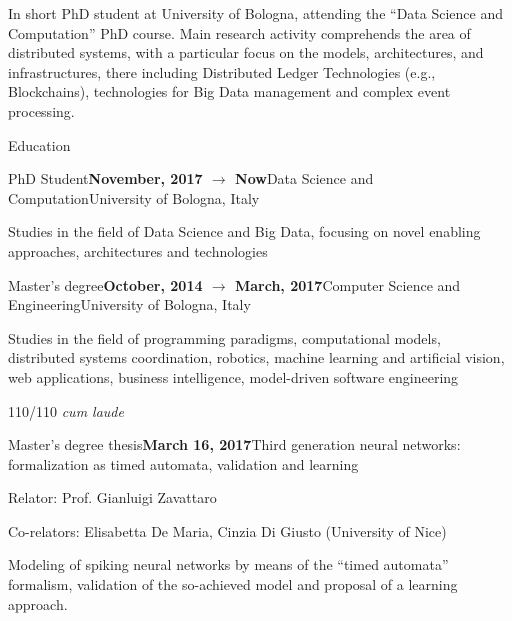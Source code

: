 \documentclass{resume} %
\begin{document}
\begin{rSection}{In short}
PhD student at University of Bologna, attending the ``Data Science and Computation'' PhD course.
%
Main research activity comprehends the area of distributed systems, with a particular focus on the models, architectures, and infrastructures, there including Distributed Ledger Technologies (e.g., Blockchains), technologies for Big Data management and complex event processing.
\end{rSection}


\begin{rSection}{Education}
\begin{rSubsection}{PhD Student}{\textbf{November, 2017 $\rightarrow$ Now}}{Data Science and Computation}{University of Bologna, Italy}
	\item Studies in the field of Data Science and Big Data, focusing on novel enabling approaches, architectures and technologies
\end{rSubsection}
%
\begin{rSubsection}{Master's degree}{\textbf{October, 2014 $\rightarrow$ March, 2017}}{Computer Science and Engineering}{University of Bologna, Italy}
\item Studies in the field of programming paradigms, computational models, distributed systems coordination, robotics, machine learning and artificial vision, web applications, business intelligence, model-driven software engineering

\item 110/110 \emph{cum laude}
\end{rSubsection}
\begin{rSubsection}{Master's degree thesis}{\textbf{March 16, 2017}}{Third generation neural networks: formalization as timed automata, validation and learning}{\begin{flushright}
			Relator: Prof. Gianluigi Zavattaro
		\end{flushright}}
	\item Co-relators: Elisabetta De Maria, Cinzia Di Giusto (University of Nice)
	\item Modeling of spiking neural networks by means of the ``timed automata'' formalism, validation of the so-achieved model and proposal of a learning approach.
	

\end{rSubsection}
\end{rSection}
\end{document}
